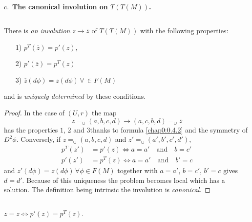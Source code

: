 c.~{\bf The canonical involution on $T(T(M))$.}

\setcounter{subsection}{18}
\subsection{}\label{chap0:0.4.19}


\begin{theorem*}
There is {\em an involution} $z\to \overline{z}$ of $T(T(M))$ with the
following properties:
\begin{itemize}
\item[{\rm 1)}] $p^{T}(\overline{z})=p'(z)$, 

\item[{\rm 2)}] $p'(\overline{z})=p^{T}(z)$

\item[{\rm 3)}] $\overline{z}(d\phi)=z(d\phi) \, \forall \, \in F(M)$
\end{itemize}
and is {\em uniquely determined} by these conditions.
\end{theorem*}

\begin{proof}
In the case of $(U,r)$ the map
$$
z\mathop{=}_{\cup}(a,b,c,d)\to (a,c,b,d)\mathop{=}_{\cup}\overline{z}
$$
has the properties $1$, $2$ and $3$\pageoriginale thanks to
formula \eqref{chap0:0.4.2} 
and the symmetry of $D^{2}\phi$. Conversely, if
$z{\displaystyle{\mathop{=}_{\cup}}}(a,b,c,d)$ and
$z'{\displaystyle{\mathop{=}_{\cup}}}(a',b',c',d')$,
\begin{align*}
p^{T}(z') &= p'(z)\Leftrightarrow a=a'\quad\text{and}\quad b=c'\\
p'(z') &= p^{T}(z)\Leftrightarrow a=a'\quad\text{and}\quad b'=c
\end{align*}
and $z'(d\phi)=z(d\phi)\,\forall \phi\in F(M)$ together with $a=a'$,
$b=c'$, $b'=c$ gives $d=d'$. Because of this uniqueness the problem
becomes local which has a solution. The definition being intrinsic the
involution is {\em canonical}.
\end{proof}

\setcounter{subsection}{19}
\subsection{}\label{chap0:0.4.20}


\begin{remark*}
$\overline{z}=z\Leftrightarrow p'(z)=p^{T}(z)$.
\end{remark*}

